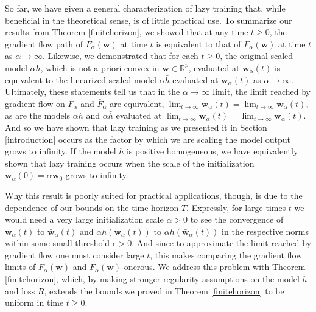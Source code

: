 \documentclass{article}
\begin{document}
So far, we have given a general characterization of lazy training that, while beneficial in the theoretical sense, is of little practical use. To summarize our results from Theorem \ref{finitehorizon}, we showed that at any time $t \geq 0$, the gradient flow path of $F_{\alpha}(\boldsymbol{w})$ at time $t$ is equivalent to that of $\bar{F}_{\alpha}(\boldsymbol{w})$ at time $t$ as $\alpha \rightarrow \infty$. Likewise, we demonstrated that for each $t \geq 0$, the original scaled model $\alpha h$, which is not a priori convex in $\boldsymbol{w} \in \mathbb{R}^p$, evaluated at $\boldsymbol{w}_{\alpha}(t)$ is equivalent to the linearized scaled model $\alpha \bar{h}$ evaluated at $\boldsymbol{\bar{w}}_{\alpha}(t)$ as $\alpha \rightarrow \infty$. Ultimately, these statements tell us that in the $\alpha \rightarrow \infty$ limit, the limit reached by gradient flow on $F_{\alpha}$ and $\bar{F}_{\alpha}$ are equivalent, $\lim_{t \to \infty} \boldsymbol{w}_{\alpha}(t) = \lim_{t \to \infty} \boldsymbol{\bar{w}}_{\alpha}(t)$, as are the models $\alpha h$ and $\alpha \bar{h}$ evaluated at $\lim_{t \to \infty} \boldsymbol{w}_{\alpha}(t) = \lim_{t \to \infty} \boldsymbol{\bar{w}}_{\alpha}(t)$. And so we have shown that lazy training as we presented it in Section \ref{introduction} occurs as the factor by which we are scaling the model output grows to infinity. If the model $h$ is positive homogeneous, we have equivalently shown that lazy training occurs when the scale of the initialization $\boldsymbol{w}_{\alpha}(0) = \alpha \boldsymbol{w}_0$ grows to infinity.

Why this result is poorly suited for practical applications, though, is due to the dependence of our bounds on the time horizon $T$. Expressly, for large times $t$ we would need a very large initialization scale $\alpha > 0$ to see the convergence of $\boldsymbol{w}_{\alpha}(t)$ to $\boldsymbol{\bar{w}}_{\alpha}(t)$ and $\alpha h(\boldsymbol{w}_{\alpha}(t))$ to $\alpha \bar{h}(\boldsymbol{\bar{w}}_{\alpha}(t))$ in the respective norms within some small threshold $\epsilon > 0$. And since to approximate the limit reached by gradient flow one must consider large $t$, this makes comparing the gradient flow limits of $F_{\alpha}(\boldsymbol{w})$ and $\bar{F}_{\alpha}(\boldsymbol{w})$ onerous. We address this problem with Theorem \ref{finitehorizon}, which, by making stronger regularity assumptions on the model $h$ and loss $R$, extends the bounds we proved in Theorem \ref{finitehorizon} to be uniform in time $t \geq 0$.
\end{document}
